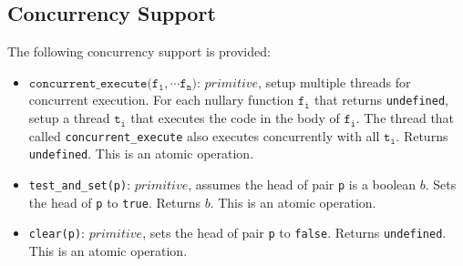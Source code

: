 \subsection*{Concurrency Support}
\label{conc_supp}
The following concurrency support is provided:

\begin{itemize}
\item \(\texttt{concurrent\_execute(}\texttt{f}_\texttt{1}, \cdots \texttt{f}_\texttt{n}\texttt{)}\): \(\textit{primitive}\), setup multiple threads for concurrent execution. For each nullary function \(\texttt{f}_\texttt{i}\) that returns \texttt{undefined}, setup a thread \(\texttt{t}_\texttt{i}\) that executes the code in the body of \(\texttt{f}_\texttt{i}\). The thread that called \texttt{concurrent\_execute} also executes concurrently with all \(\texttt{t}_\texttt{i}\). Returns \texttt{undefined}. This is an atomic operation.
\item \texttt{test\_and\_set(p)}: \(\textit{primitive}\), assumes the head of pair \texttt{p} is a boolean \(b\). Sets the head of \texttt{p} to \texttt{true}. Returns \(b\). This is an atomic operation.
\item \texttt{clear(p)}: \(\textit{primitive}\), sets the head of pair \texttt{p} to \texttt{false}. Returns \texttt{undefined}. This is an atomic operation.
\end{itemize}
